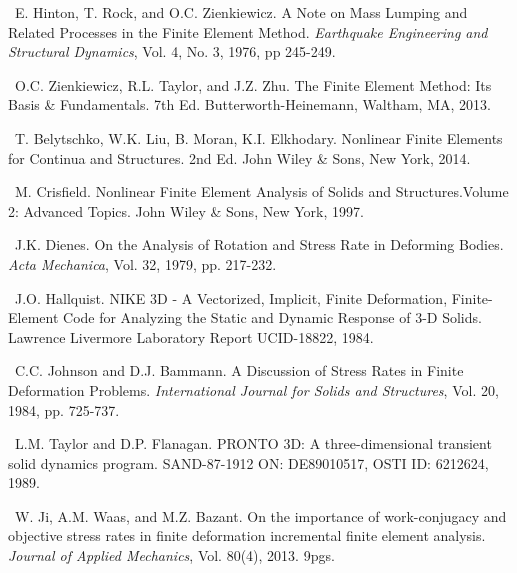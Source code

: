 \documentclass[11pt]{report}
\numberwithin{equation}{section}
\newcommand{\ti}{\emph}
\newcounter{sectrefs}
\begin{document}
\medskip
{}~E. Hinton, T. Rock, and O.C. Zienkiewicz.
A Note on Mass Lumping and Related Processes in the Finite Element Method. \ti{Earthquake Engineering and
Structural Dynamics}, Vol. 4, No. 3, 1976, pp 245-249.

\medskip
{}~O.C. Zienkiewicz, R.L. Taylor, 
and J.Z. Zhu. The Finite Element Method: Its Basis \& Fundamentals. 7th Ed. Butterworth-Heinemann, 
Waltham, MA, 2013.

\medskip
{}~T. Belytschko, W.K. Liu,
B. Moran, K.I. Elkhodary. Nonlinear Finite Elements for Continua and Structures. 2nd Ed. John Wiley \& Sons,
New York, 2014.

\medskip
{}~M. Crisfield. Nonlinear Finite Element Analysis of Solids and Structures.Volume 2: Advanced Topics. John Wiley \& Sons,
New York, 1997.

\medskip
{}~J.K. Dienes. On the Analysis of 
Rotation and Stress Rate in Deforming Bodies. \ti{Acta Mechanica}, Vol. 32, 1979, pp. 217-232.

\medskip
{}~J.O. Hallquist. NIKE 3D - A Vectorized, 
Implicit, Finite Deformation, Finite-Element Code for Analyzing the Static and 
Dynamic Response of 3-D Solids. Lawrence Livermore Laboratory Report UCID-18822, 1984.

\medskip
{}~C.C. Johnson and D.J. Bammann.
A Discussion of Stress Rates in Finite Deformation Problems. \ti{International Journal for Solids and Structures},
 Vol. 20, 1984, pp. 725-737.

\medskip
{}~L.M. Taylor and D.P. Flanagan.
PRONTO 3D: A three-dimensional transient solid dynamics program. SAND-87-1912 ON: DE89010517,
OSTI ID: 6212624, 1989.

\medskip
{}~W. Ji, A.M. Waas, and M.Z. Bazant. 
On the importance of work-conjugacy and objective stress rates in finite deformation incremental finite element analysis.
\ti{Journal of Applied Mechanics},  Vol. 80(4), 2013. 9pgs.

 
 
\end{document}
